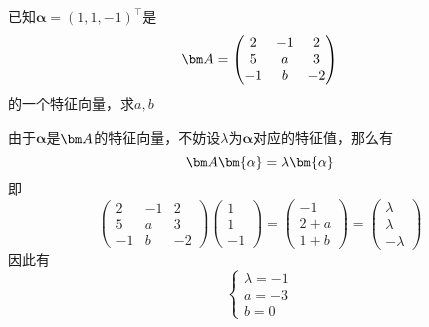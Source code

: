 \begin{example}
    已知$\bm{\alpha}=(1,1,-1)^\intercal$是
    \[
        \mat{A} =
        \begin{pmatrix}
            2  & -1 & 2  \\
            5  & a  & 3  \\
            -1 & b  & -2
        \end{pmatrix}
    \]
    的一个特征向量，求$a,b$
\end{example}
\begin{solution}
    由于$\bm{\alpha}$是$\mat{A}$的特征向量，不妨设$\lambda$为$\bm{\alpha}$对应的特征值，那么有
    \[ \mat{A}\bm{\alpha} = \lambda\bm{\alpha} \]
    即
    \[
        \begin{pmatrix}
            2  & -1 & 2  \\
            5  & a  & 3  \\
            -1 & b  & -2
        \end{pmatrix}
        \begin{pmatrix}
            1 \\1\\-1
        \end{pmatrix}
        =
        \begin{pmatrix}
            -1 \\ 2+a \\ 1+b
        \end{pmatrix}
        =
        \begin{pmatrix}
            \lambda \\ \lambda \\ -\lambda
        \end{pmatrix}
    \]
    因此有
    \[
        \begin{cases}
            \lambda = -1 \\
            a = -3       \\
            b=0
        \end{cases}
    \]
\end{solution}

